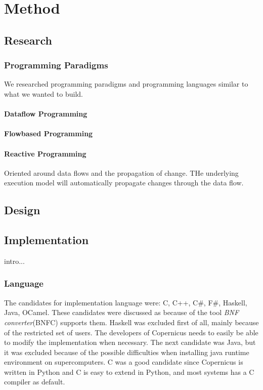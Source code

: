 \chapter{Method}

\section{Research}

\subsection{Programming Paradigms}
We researched programming paradigms and programming languages similar
to what we wanted to build.

\subsubsection{Dataflow Programming}

\subsubsection{Flowbased Programming}

\subsubsection{Reactive Programming}
Oriented around data flows and the propagation of change. THe
underlying execution model will automatically propagate changes
through the data flow.


\section{Design}



\section{Implementation}
intro...


\subsection{Language}
The candidates for implementation language were: C, C++, C#, F#,
Haskell, Java, OCamel. These candidates were discussed as because of
the tool \emph{BNF converter}(BNFC) supports them. Haskell was
excluded first of all, mainly because of the restricted set of
users. The developers of Copernicus needs to easily be able to modify
the implementation when necessary. The next candidate was Java, but it
was excluded because of the possible difficulties when installing java
runtime environment on supercomputers. C was a good candidate since
Copernicus is written in Python and C is easy to extend in Python, and
most systems has a C compiler as default.

